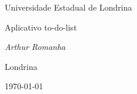 \begin{titlepage}
  \centering
  \vspace*{2cm}
  {\Large Universidade Estadual de Londrina \par}
  \vspace{3cm}
  {\Huge Aplicativo to-do-list \par}
  \vspace{2cm}
  {\Large\itshape Arthur Romanha \par}
  \vfill
  {\large Londrina \par}
  {\Large \today \par}
\end{titlepage}

